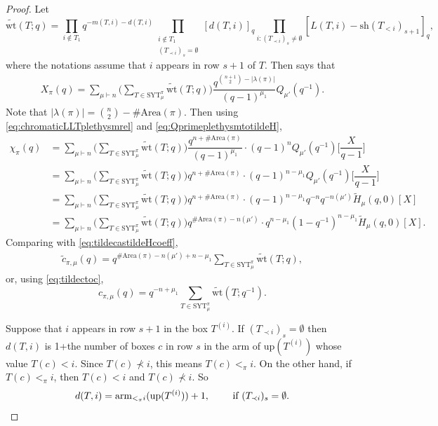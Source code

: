 \documentclass[12pt,reqno]{amsart}
\theoremstyle{plain}
\theoremstyle{definition}
\theoremstyle{remark}
\theoremstyle{example}
\numberwithin{equation}{section}
\newcommand\up{\mathrm{up}}
\newcommand\arm{\mathrm{arm}}
\newcommand{\SYT}{\mathrm{SYT}}
\newcommand{\wt}{\mathrm{wt}}
\newcommand{\Area}{\mathrm{Area}}
\begin{document}
\begin{proof}
	Let $$ \widetilde{\wt}(T;q) = \prod_{i \notin T_1} q^{-m(T,i)-d(T,i)} \prod_{\substack{i \notin T_1 \\ (T_{\prec i})_s = \emptyset}} [d(T,i)]_q \prod_{i: (T_{\prec i})_s \neq \emptyset} [L(T,i) - \mathrm{sh}(T_{<i})_{s+1}]_q, $$ where the notations assume that $i$ appears in row $s+1$ of $T$. Then \cite[Theorem 4.1]{GMRWW_Macexpansion} says that \begin{align*}
		X_\pi(q) = \sum_{\mu \vdash n} \bigg(\sum_{T \in \SYT^\pi_\mu} \widetilde{\wt}(T;q)\bigg) \dfrac{q^{\binom{n+1}{2}-|\lambda(\pi)|}}{(q-1)^{\mu_1}} Q_{\mu'}(q^{-1}).
	\end{align*}
	Note that $|\lambda(\pi)| = \binom{n}{2} - \#\Area(\pi)$. Then using \eqref{eq:chromaticLLTplethysmrel} and \eqref{eq:QprimeplethysmtotildeH},
	\begin{align*}
		\chi_\pi(q) &= \sum_{\mu \vdash n} \bigg(\sum_{T \in \SYT^\pi_\mu} \widetilde{\wt}(T;q)\bigg) \dfrac{q^{n+\#\Area(\pi)}}{(q-1)^{\mu_1}} \cdot (q-1)^n Q_{\mu'}(q^{-1})\bigg[\dfrac{X}{q-1}\bigg]
		\\
		&= \sum_{\mu \vdash n} \bigg(\sum_{T \in \SYT^\pi_\mu} \widetilde{\wt}(T;q)\bigg) q^{n+\#\Area(\pi)}\cdot (q-1)^{n-\mu_1}Q_{\mu'}(q^{-1})\bigg[\dfrac{X}{q-1}\bigg]
		\\
		&= \sum_{\mu \vdash n} \bigg(\sum_{T \in \SYT^\pi_\mu} \widetilde{\wt}(T;q)\bigg) q^{n+\#\Area(\pi)}\cdot (q-1)^{n-\mu_1}q^{-n}q^{-n(\mu')}\widetilde{H}_\mu(q,0)[X] 
		\\
		&= \sum_{\mu \vdash n} \bigg(\sum_{T \in \SYT^\pi_\mu} \widetilde{\wt}(T;q)\bigg) q^{\#\Area(\pi)-n(\mu')} \cdot q^{n-\mu_1}(1-q^{-1})^{n-\mu_1}\widetilde{H}_{\mu}(q,0)[X].
	\end{align*}
Comparing with \eqref{eq:tildecastildeHcoeff},
\begin{align*}
	\widetilde{c}_{\pi,\mu}(q) = q^{\# \Area(\pi) - n(\mu')+ n - \mu_1} \sum_{T \in \SYT^\pi_\mu} \widetilde{\wt}(T;q),
\end{align*}
or, using \eqref{eq:tildectoc}, \begin{equation}\label{eq:castildewt}
	c_{\pi,\mu}(q) = q^{-n+\mu_1} \sum_{T \in \SYT^\pi_\mu} \widetilde{\wt}(T;q^{-1}).
\end{equation}

Suppose that $i$ appears in row $s+1$ in the box $T^{(i)}$. If $(T_{\prec i})_s = \emptyset$ then $d(T,i)$ is 1+the number of boxes $c$ in row $s$ in the arm of $\up(T^{(i)})$ whose value $T(c) < i$. Since $T(c) \nprec i$, this means $T(c) <_\pi i$. On the other hand, if $T(c) <_\pi i$, then $T(c) <i $ and $T(c) \nprec i$. So $$ d(T,i) = \arm_{<_\pi i}(\up(T^{(i)}))+1, \qquad\hbox{ if } (T_{\prec i})_s = \emptyset.$$


\end{proof}
\end{document}
